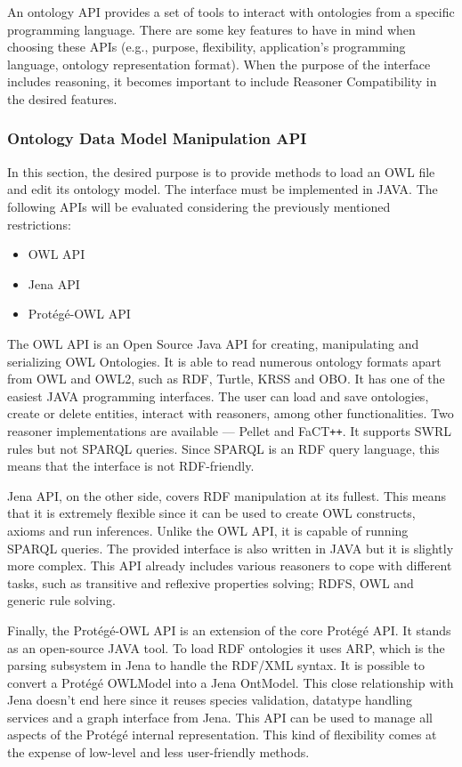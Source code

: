 An ontology API provides a set of tools to interact with ontologies from a specific programming language. There are some key features to have in mind when choosing these APIs (e.g., purpose, flexibility, application's programming language, ontology representation format). When the purpose of the interface includes reasoning, it becomes important to include Reasoner Compatibility in the desired features.

\subsubsection{Ontology Data Model Manipulation API}

In this section, the desired purpose is to provide methods to load an OWL file and edit its ontology model. The interface must be implemented in JAVA. The following APIs will be evaluated considering the previously mentioned restrictions:
\begin{itemize}
	\item OWL API
	\item Jena API
	\item Protégé-OWL API
\end{itemize}

The OWL API is an Open Source Java API for creating, manipulating and serializing OWL Ontologies. It is able to read numerous ontology formats apart from OWL and OWL2, such as RDF, Turtle, KRSS and OBO. It has one of the easiest JAVA programming interfaces. The user can load and save ontologies, create or delete entities, interact with reasoners, among other functionalities. Two reasoner implementations are available --- Pellet and FaCT\texttt{++}. It supports SWRL rules but not SPARQL queries. Since SPARQL is an RDF query language, this means that the interface is not RDF-friendly.

Jena API, on the other side, covers RDF manipulation at its fullest. This means that it is extremely flexible since it can be used to create OWL constructs, axioms and run inferences. Unlike the OWL API, it is capable of running SPARQL queries. The provided interface is also written in JAVA but it is slightly more complex. This API already includes various reasoners to cope with different tasks, such as transitive and reflexive properties solving; RDFS, OWL and generic rule solving.

Finally, the Protégé-OWL API is an extension of the core Protégé API. It stands as an open-source JAVA tool. To load RDF ontologies it uses ARP, which is the parsing subsystem in Jena to handle the RDF/XML syntax. It is possible to convert a Protégé OWLModel into a Jena OntModel. This close relationship with Jena doesn't end here since it reuses species validation, datatype handling services and a graph interface from Jena. This API can be used to manage all aspects of the Protégé internal representation. This kind of flexibility comes at the expense of low-level and less user-friendly methods.

